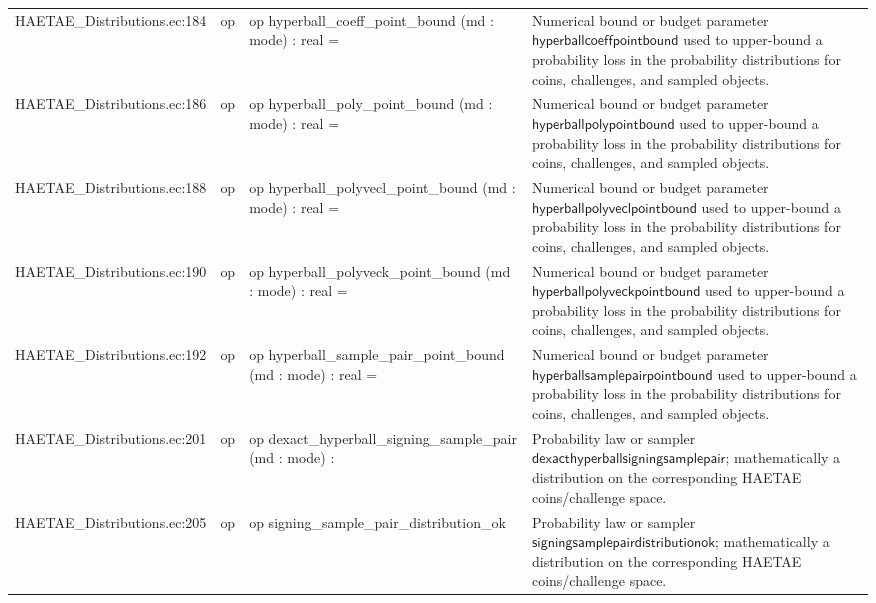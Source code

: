 \documentclass[10pt]{article}
\begin{document}
\begin{longtable}{L{0.11\textwidth}L{0.055\textwidth}L{0.385\textwidth}L{0.41\textwidth}}
HAETAE\_\allowbreak{}Distributions.\allowbreak{}ec:\allowbreak{}184 & op & {\ttfamily\scriptsize op hyperball\_\allowbreak{}coeff\_\allowbreak{}point\_\allowbreak{}bound (md : mode) : real =} & Numerical bound or budget parameter $\mathsf{hyperballcoeffpointbound}$ used to upper-bound a probability loss in the probability distributions for coins, challenges, and sampled objects. \\
HAETAE\_\allowbreak{}Distributions.\allowbreak{}ec:\allowbreak{}186 & op & {\ttfamily\scriptsize op hyperball\_\allowbreak{}poly\_\allowbreak{}point\_\allowbreak{}bound (md : mode) : real =} & Numerical bound or budget parameter $\mathsf{hyperballpolypointbound}$ used to upper-bound a probability loss in the probability distributions for coins, challenges, and sampled objects. \\
HAETAE\_\allowbreak{}Distributions.\allowbreak{}ec:\allowbreak{}188 & op & {\ttfamily\scriptsize op hyperball\_\allowbreak{}polyvecl\_\allowbreak{}point\_\allowbreak{}bound (md : mode) : real =} & Numerical bound or budget parameter $\mathsf{hyperballpolyveclpointbound}$ used to upper-bound a probability loss in the probability distributions for coins, challenges, and sampled objects. \\
HAETAE\_\allowbreak{}Distributions.\allowbreak{}ec:\allowbreak{}190 & op & {\ttfamily\scriptsize op hyperball\_\allowbreak{}polyveck\_\allowbreak{}point\_\allowbreak{}bound (md : mode) : real =} & Numerical bound or budget parameter $\mathsf{hyperballpolyveckpointbound}$ used to upper-bound a probability loss in the probability distributions for coins, challenges, and sampled objects. \\
HAETAE\_\allowbreak{}Distributions.\allowbreak{}ec:\allowbreak{}192 & op & {\ttfamily\scriptsize op hyperball\_\allowbreak{}sample\_\allowbreak{}pair\_\allowbreak{}point\_\allowbreak{}bound (md : mode) : real =} & Numerical bound or budget parameter $\mathsf{hyperballsamplepairpointbound}$ used to upper-bound a probability loss in the probability distributions for coins, challenges, and sampled objects. \\
HAETAE\_\allowbreak{}Distributions.\allowbreak{}ec:\allowbreak{}201 & op & {\ttfamily\scriptsize op dexact\_\allowbreak{}hyperball\_\allowbreak{}signing\_\allowbreak{}sample\_\allowbreak{}pair (md : mode) :} & Probability law or sampler $\mathsf{dexacthyperballsigningsamplepair}$; mathematically a distribution on the corresponding HAETAE coins/challenge space. \\
HAETAE\_\allowbreak{}Distributions.\allowbreak{}ec:\allowbreak{}205 & op & {\ttfamily\scriptsize op signing\_\allowbreak{}sample\_\allowbreak{}pair\_\allowbreak{}distribution\_\allowbreak{}ok} & Probability law or sampler $\mathsf{signingsamplepairdistributionok}$; mathematically a distribution on the corresponding HAETAE coins/challenge space. \\

\end{longtable}
\end{document}
